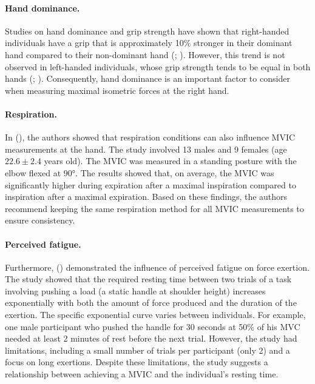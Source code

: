 \paragraph*{Hand dominance.} Studies on hand dominance and grip strength have shown that right-handed individuals have a grip that is approximately 10\% stronger in their dominant hand compared to their non-dominant hand (\cite{jansenEffectsFingernailLength2000}; \cite{bohannonGripStrengthSummary2003}). However, this trend is not observed in left-handed individuals, whose grip strength tends to be equal in both hands (\cite{crosbyHandStrengthNormative1994}; \cite{bohannonGripStrengthSummary2003}). Consequently, hand dominance is an important factor to consider when measuring maximal isometric forces at the right hand.

\paragraph*{Respiration.} In (\cite{leeComparisonMaximumVoluntary2016}), the authors showed that respiration conditions can also influence MVIC measurements at the hand. The study involved 13 males and 9 females (age $22.6\pm 2.4$ years old). The MVIC was measured in a standing posture with the elbow flexed at 90°. The results showed that, on average, the MVIC was significantly higher during expiration after a maximal inspiration compared to inspiration after a maximal expiration. Based on these findings, the authors recommend keeping the same respiration method for all MVIC measurements to ensure consistency.

\paragraph*{Perceived fatigue.} Furthermore, (\cite{roseFatigueRecoveryStatic2014}) demonstrated the influence of perceived fatigue on force exertion. The study showed that the required resting time between two trials of a task involving pushing a load (a static handle at shoulder height) increases exponentially with both the amount of force produced and the duration of the exertion. The specific exponential curve varies between individuals. For example, one male participant who pushed the handle for 30 seconds at 50\% of his MVC needed at least 2 minutes of rest before the next trial. However, the study had limitations, including a small number of trials per participant (only 2) and a focus on long exertions. Despite these limitations, the study suggests a relationship between achieving a MVIC and the individual's resting time.

